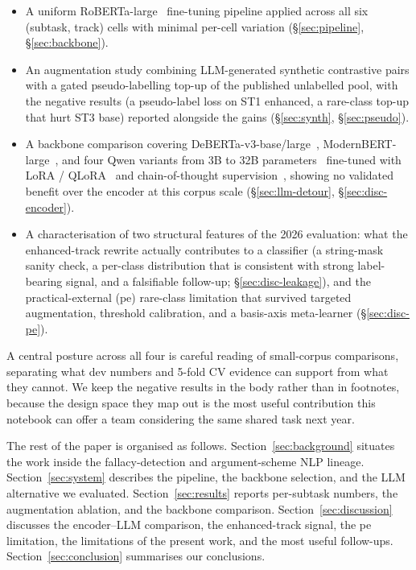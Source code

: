\begin{itemize}
  \item[\textbf{C1}] A uniform RoBERTa-large~\cite{liu2019roberta} fine-tuning pipeline applied across all six (subtask, track) cells with minimal per-cell variation (\S\ref{sec:pipeline}, \S\ref{sec:backbone}).
  \item[\textbf{C2}] An augmentation study combining LLM-generated synthetic contrastive pairs with a gated pseudo-labelling top-up of the published unlabelled pool, with the negative results (a pseudo-label loss on ST1 enhanced, a rare-class top-up that hurt ST3 base) reported alongside the gains (\S\ref{sec:synth}, \S\ref{sec:pseudo}).
  \item[\textbf{C3}] A backbone comparison covering DeBERTa-v3-base/large~\cite{he2021debertav3}, ModernBERT-large~\cite{warner2024modernbert}, and four Qwen variants from 3B to 32B parameters~\cite{qwen25,qwen3} fine-tuned with LoRA / QLoRA~\cite{hu2022lora,dettmers2023qlora} and chain-of-thought supervision~\cite{wei2022cot}, showing no validated benefit over the encoder at this corpus scale (\S\ref{sec:llm-detour}, \S\ref{sec:disc-encoder}).
  \item[\textbf{C4}] A characterisation of two structural features of the 2026 evaluation: what the enhanced-track rewrite actually contributes to a classifier (a string-mask sanity check, a per-class distribution that is consistent with strong label-bearing signal, and a falsifiable follow-up; \S\ref{sec:disc-leakage}), and the practical-external (\textsf{pe}) rare-class limitation that survived targeted augmentation, threshold calibration, and a basis-axis meta-learner (\S\ref{sec:disc-pe}).
\end{itemize}

A central posture across all four is careful reading of small-corpus comparisons, separating what dev numbers and 5-fold CV evidence can support from what they cannot. We keep the negative results in the body rather than in footnotes, because the design space they map out is the most useful contribution this notebook can offer a team considering the same shared task next year.

The rest of the paper is organised as follows. Section~\ref{sec:background} situates the work inside the fallacy-detection and argument-scheme NLP lineage. Section~\ref{sec:system} describes the pipeline, the backbone selection, and the LLM alternative we evaluated. Section~\ref{sec:results} reports per-subtask numbers, the augmentation ablation, and the backbone comparison. Section~\ref{sec:discussion} discusses the encoder--LLM comparison, the enhanced-track signal, the \textsf{pe} limitation, the limitations of the present work, and the most useful follow-ups. Section~\ref{sec:conclusion} summarises our conclusions.
